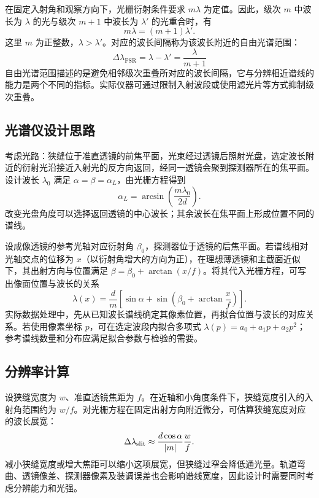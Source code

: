 \documentclass[UTF8,a4paper,12pt]{ctexart}
\begin{document}
在固定入射角和观察方向下，光栅衍射条件要求 $m\lambda$ 为定值。因此，级次 $m$ 中波长为 $\lambda$ 的光与级次 $m+1$ 中波长为 $\lambda'$ 的光重合时，有
\begin{equation}
  m\lambda=(m+1)\lambda'.
\end{equation}
这里 $m$ 为正整数，$\lambda>\lambda'$。对应的波长间隔称为该波长附近的自由光谱范围：
\begin{equation}
  \Delta\lambda_{\mathrm{FSR}}=\lambda-\lambda'
  =\frac{\lambda}{m+1}
\end{equation}
自由光谱范围描述的是避免相邻级次重叠所对应的波长间隔，它与分辨相近谱线的能力是两个不同的指标。实际仪器可通过限制入射波段或使用滤光片等方式抑制级次重叠。


\subsection{光谱仪设计思路}
考虑光路：狭缝位于准直透镜的前焦平面，光束经过透镜后照射光盘，选定波长附近的衍射光沿接近入射光的反方向返回，经同一透镜会聚到探测器所在的焦平面。设计波长 $\lambda_0$ 满足 $\alpha=\beta=\alpha_L$，由光栅方程得到
\begin{equation}
  \alpha_L=\arcsin\!\left(\frac{m\lambda_0}{2d}\right).
\end{equation}
改变光盘角度可以选择返回透镜的中心波长；其余波长在焦平面上形成位置不同的谱线。

设成像透镜的参考光轴对应衍射角 $\beta_0$，探测器位于透镜的后焦平面。若谱线相对光轴交点的位移为 $x$（以衍射角增大的方向为正），在理想薄透镜和主截面近似下，其出射方向与位置满足 $\beta=\beta_0+\arctan(x/f)$。将其代入光栅方程，可写出像面位置与波长的关系
\begin{equation}
  \lambda(x)=\frac{d}{m}\left[\sin\alpha+
    \sin\!\left(\beta_0+\arctan\frac{x}{f}\right)\right].
  \label{eq:pixel-wavelength}
\end{equation}
实际数据处理中，先从已知波长谱线确定其像素位置，再拟合位置与波长的对应关系。若使用像素坐标 $p$，可在选定波段内拟合多项式 $\lambda(p)=a_0+a_1p+a_2p^2$；参考谱线数量和分布应满足拟合参数与检验的需要。

\subsection{分辨率计算}
设狭缝宽度为 $w$、准直透镜焦距为 $f$。在近轴和小角度条件下，狭缝宽度引入的入射角范围约为 $w/f$。对光栅方程在固定出射方向附近微分，可估算狭缝宽度对应的波长展宽：
\begin{equation}
  \Delta\lambda_{\rm slit}\approx\frac{d\cos\alpha}{|m|}\frac{w}{f}.
\end{equation}
减小狭缝宽度或增大焦距可以缩小这项展宽，但狭缝过窄会降低通光量。轨道弯曲、透镜像差、探测器像素及装调误差也会影响谱线宽度，因此设计时需要同时考虑分辨能力和光强。
\end{document}

